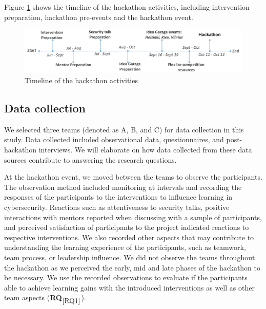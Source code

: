 \documentclass[runningheads]{llncs}
\newcommand{\hr}[1]{\textbf{RQ}$_{\ref{#1}}$}
\begin{document}
Figure \ref{Fig:timeline} shows the timeline of the hackathon activities, including intervention preparation, hackathon pre-events and the hackathon event.
\begin{figure}[h]
  \centering
  \includegraphics[width=\linewidth]{timelinehack.pdf}
  \caption{Timeline of the hackathon activities} \label{Fig:timeline} 
\end{figure}

\subsection{Data collection}
We selected three teams (denoted as A, B, and C) for data collection in this study. Data collected included observational data, questionnaires, and post-hackathon interviews. We will elaborate on how data collected from these data sources contribute to answering the research questions.

At the hackathon event, we moved between the teams to observe the participants. The observation method included monitoring at intervals and recording the responses of the participants to the interventions to influence learning in cybersecurity.
Reactions such as attentiveness to security talks, positive interactions with mentors reported when discussing with a sample of participants, and perceived satisfaction of participants to the project indicated reactions to respective interventions. We also recorded other aspects that may contribute to understanding the learning experience of the participants, such as teamwork, team process, or leadership influence.  
We did not observe the teams throughout the hackathon as we perceived the early, mid and late phases of the hackathon to be necessary.
We use the recorded observations to evaluate if the participants able to achieve learning gains with the introduced interventions as well as other team aspects (\hr{RQ1}). 
\end{document}
